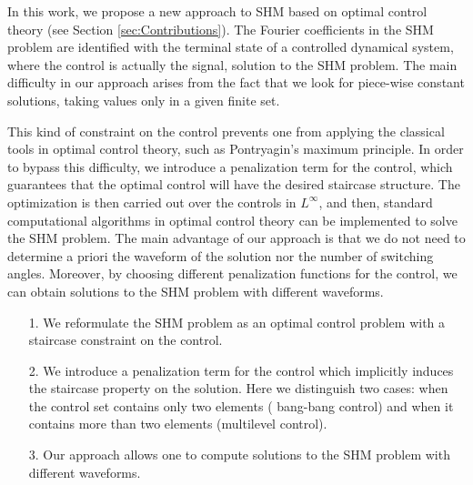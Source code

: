 \documentclass[twocolumn]{autart}    %
\begin{document}
In this work, we propose a new approach to SHM based on optimal control theory (see Section \ref{sec:Contributions}). The Fourier coefficients in the SHM problem are identified with the terminal state of a controlled dynamical system, where the control is actually the signal, solution to the SHM problem. The main difficulty in our approach arises from the fact that we look for piece-wise constant solutions, taking values only in a given finite set.

This kind of constraint on the control prevents one from applying the classical tools in optimal control theory, such as Pontryagin's maximum principle. In order to bypass this difficulty, we introduce a penalization term for the control, which guarantees that the optimal control will have the desired staircase structure. The optimization is then carried out over the controls in $L^\infty$, and then, standard computational algorithms in optimal control theory can be implemented to solve the SHM problem. The main advantage of our approach is that we do not need to determine a priori the waveform of the solution nor the number of switching angles. Moreover, by choosing different penalization functions for the control, we can obtain solutions to the SHM problem with different waveforms.

\begin{enumerate}
    \item[1.] We reformulate the SHM problem as an optimal control problem with a staircase constraint on the control.
    \item[2.] We introduce a penalization term for the control which implicitly induces the staircase property on the solution. Here we distinguish two cases: when the control set contains only two elements ( bang-bang control) and when it contains more than two elements (multilevel control).
    \item[3.] Our approach allows one to compute solutions to the SHM problem with different waveforms.
\end{enumerate}
\end{document}
